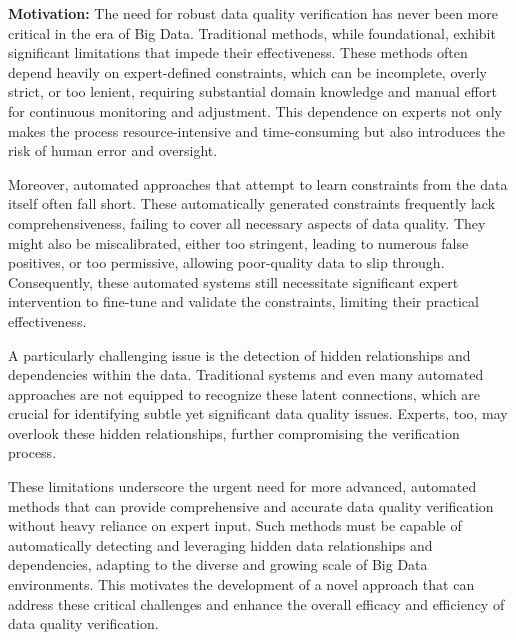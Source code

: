 
\noindent\textbf{Motivation:} The need for robust data quality verification has never been more critical in the era of Big Data. Traditional methods, while foundational, exhibit significant limitations that impede their effectiveness. These methods often depend heavily on expert-defined constraints, which can be incomplete, overly strict, or too lenient, requiring substantial domain knowledge and manual effort for continuous monitoring and adjustment. This dependence on experts not only makes the process resource-intensive and time-consuming but also introduces the risk of human error and oversight.

Moreover, automated approaches that attempt to learn constraints from the data itself often fall short. These automatically generated constraints frequently lack comprehensiveness, failing to cover all necessary aspects of data quality. They might also be miscalibrated, either too stringent, leading to numerous false positives, or too permissive, allowing poor-quality data to slip through. Consequently, these automated systems still necessitate significant expert intervention to fine-tune and validate the constraints, limiting their practical effectiveness.

A particularly challenging issue is the detection of hidden relationships and dependencies within the data. Traditional systems and even many automated approaches are not equipped to recognize these latent connections, which are crucial for identifying subtle yet significant data quality issues. Experts, too, may overlook these hidden relationships, further compromising the verification process.

These limitations underscore the urgent need for more advanced, automated methods that can provide comprehensive and accurate data quality verification without heavy reliance on expert input. Such methods must be capable of automatically detecting and leveraging hidden data relationships and dependencies, adapting to the diverse and growing scale of Big Data environments. This motivates the development of a novel approach that can address these critical challenges and enhance the overall efficacy and efficiency of data quality verification.

